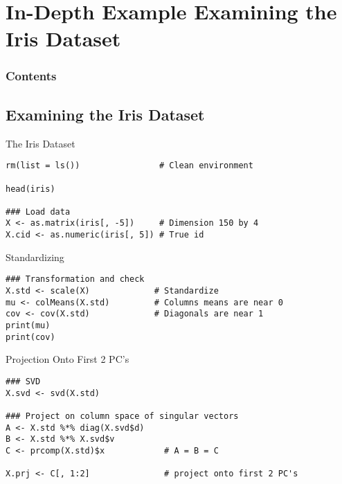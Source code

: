 \section[Iris]{In-Depth Example Examining the Iris Dataset}

\hidenum
\begin{frame}[noframenumbering]
\frametitle{Contents}
 \tableofcontents[currentsection,hideothersubsections,sectionstyle=show/hide]
\end{frame}
\shownum

\subsection{Examining the Iris Dataset}

\begin{frame}[fragile]
  \begin{block}{The Iris Dataset}\pause
\begin{lstlisting}
rm(list = ls())                # Clean environment

head(iris)

### Load data
X <- as.matrix(iris[, -5])     # Dimension 150 by 4
X.cid <- as.numeric(iris[, 5]) # True id
\end{lstlisting}
\end{block}
\end{frame}


\begin{frame}[fragile]
  \begin{block}{Standardizing}\pause
\begin{lstlisting}
### Transformation and check
X.std <- scale(X)             # Standardize
mu <- colMeans(X.std)         # Columns means are near 0
cov <- cov(X.std)             # Diagonals are near 1
print(mu)
print(cov)
\end{lstlisting}
\end{block}
\end{frame}

\begin{frame}[fragile]
  \begin{block}{Projection Onto First 2 PC's}\pause
\begin{lstlisting}
### SVD
X.svd <- svd(X.std)

### Project on column space of singular vectors
A <- X.std %*% diag(X.svd$d)
B <- X.std %*% X.svd$v
C <- prcomp(X.std)$x            # A = B = C

X.prj <- C[, 1:2]               # project onto first 2 PC's
\end{lstlisting}
\end{block}
\end{frame}

